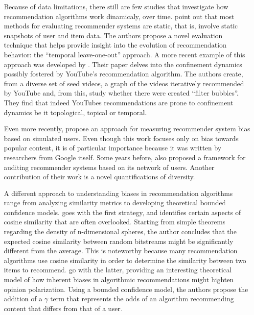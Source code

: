 Because of data limitations, there still are few studies that investigate how
recommendation algorithms work dinamicaly, over time.
\citet{burke_evaluating_2010} point out that most methods for evaluating
recommender systems are static, that is, involve static snapshots of user and
item data. The authors propose a novel evaluation technique that helps provide
insight into the evolution of recommendation behavior: the ``temporal
leave-one-out'' approach. A more recent example of this approach was developed
by \citet{roth_tubes_2020}. Their paper delves into the confinement dynamics
possibly fostered by YouTube's recommendation algorithm. The authors create,
from a diverse set of seed videos, a graph of the videos iteratively recommended
by YouTube and, from this, study whether there were created ``filter bubbles''.
They find that indeed YouTubes recommendations are prone to confinement dynamics
be it topological, topical or temporal.

Even more recently, \citet{yao_measuring_2021} propose an approach for measuring
recommender system bias based on simulated users. Even though this work focuses
only on bias towards popular content, it is of particular importance because it
was written by researchers from Google itself. Some years before,
\citet{dash_network-centric_2019} also proposed a framework for auditing
recommender systems based on its network of users. Another contribution of their
work is a novel quantifications of diversity.

A different approach to understanding biases in recommendation algorithms range
from analyzing similarity metrics to developing theoretical bounded confidence
models. \citet{giller_statistical_2012} goes with the first strategy, and
identifies certain aspects of cosine similarity that are often overlooked.
Starting from simple theorems regarding the density of n-dimensional spheres,
the author concludes that the expected cosine similarity between random
bitstreams might be significantly different from the average. This is noteworthy
because many recommendation algorithms use cosine similarity in order to
determine the similarity between two items to recommend.
\citet{sirbu_algorithmic_2019} go with the latter, providing an interesting
theoretical model of how inherent biases in algorithmic recommendations might
highten opinion polarization. Using a bounded confidence model, the authors
propose the addition of a $\gamma$ term that represents the odds of an algorithm
recommending content that differs from that of a user.

